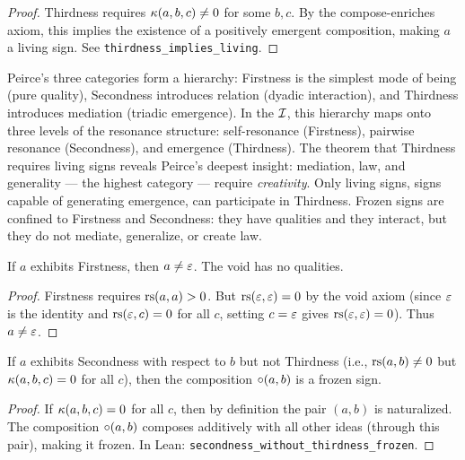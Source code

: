 \begin{proof}
Thirdness requires $\kappa(a, b, c) \neq 0$ for some $b, c$. By
the compose-enriches axiom, this implies the existence of a positively
emergent composition, making $a$ a living sign. See
\texttt{thirdness\_implies\_living}.
\end{proof}

\begin{interpretation}
Peirce's three categories form a hierarchy: Firstness is the simplest
mode of being (pure quality), Secondness introduces relation (dyadic
interaction), and Thirdness introduces mediation (triadic emergence).
In the $\mathcal{I}$, this hierarchy maps onto three levels of the resonance
structure: self-resonance (Firstness), pairwise resonance (Secondness),
and emergence (Thirdness). The theorem that Thirdness requires living
signs reveals Peirce's deepest insight: mediation, law, and
generality --- the highest category --- require \emph{creativity}.
Only living signs, signs capable of generating emergence, can
participate in Thirdness. Frozen signs are confined to Firstness
and Secondness: they have qualities and they interact, but they do
not mediate, generalize, or create law.
\end{interpretation}

\begin{theorem}
\label{thm:firstness-nonvoid}
If $a$ exhibits Firstness, then $a \neq \varepsilon$. The void has no qualities.
\end{theorem}

\begin{proof}
Firstness requires $\mathrm{rs}(a, a) > 0$. But $\mathrm{rs}(\varepsilon, \varepsilon) = 0$ by the void axiom (since $\varepsilon$ is the identity and $\mathrm{rs}(\varepsilon, c) = 0$ for all $c$, setting $c = \varepsilon$ gives $\mathrm{rs}(\varepsilon, \varepsilon) = 0$). Thus $a \neq \varepsilon$.
\end{proof}

\begin{theorem}
\label{thm:secondness-frozen}
If $a$ exhibits Secondness with respect to $b$ but not Thirdness (i.e., $\mathrm{rs}(a, b) \neq 0$ but $\kappa(a, b, c) = 0$ for all $c$), then the composition $\circ(a, b)$ is a frozen sign.
\end{theorem}

\begin{proof}
If $\kappa(a, b, c) = 0$ for all $c$, then by definition the pair $(a, b)$ is naturalized. The composition $\circ(a, b)$ composes additively with all other ideas (through this pair), making it frozen. In Lean: \texttt{secondness\_without\_thirdness\_frozen}.
\end{proof}

